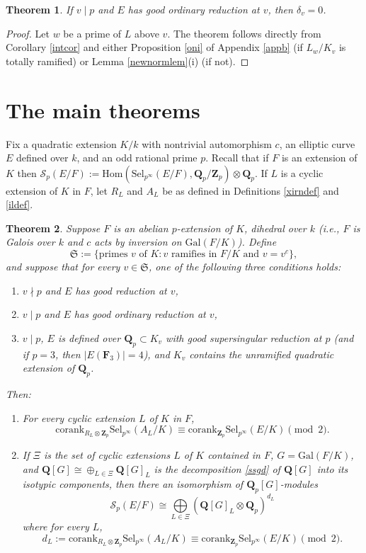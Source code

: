 \documentclass[reqno]{amsart}
\newtheorem{thm}{Theorem}[section]
\theoremstyle{definition}
\renewcommand{\theenumi}{(\roman{enumi})}
\def\Z{\mathbf{Z}}
\def\Q{\mathbf{Q}}
\def\F{\mathbf{F}}
\def\Zp{\Z_p}
\def\Qp{\Q_p}
\def\cS{\mathcal{S}}
\def\Hom{\mathrm{Hom}}
\def\Gal{\mathrm{Gal}}
\def\cork{\mathrm{corank}}
\def\Sel{\mathrm{Sel}}
\def\Scp{\cS_p}
\def\dirsum#1{\underset{#1}{\textstyle\bigoplus}}
\def\k{k}
\def\Sbad{\mathfrak{S}}
\begin{document}
\begin{thm}
\label{par4}
If $v \mid p$ and $E$ has good ordinary reduction at $v$, 
then $\delta_v = 0$.
\end{thm}

\begin{proof}
Let $w$ be a prime of $L$ above $v$.  The theorem follows 
directly from Corollary \ref{intcor} and either 
Proposition \ref{oni} of Appendix \ref{appb} 
(if $L_w/K_v$ is totally ramified) or 
Lemma \ref{newnormlem}(i) (if not).
\end{proof}


\section{The main theorems}
\label{d1}

Fix a quadratic extension $K/\k$ with 
nontrivial automorphism $c$, an elliptic curve $E$ defined 
over $\k$, and an odd rational prime $p$.
Recall that if $F$ is an extension of $K$ then 
$\Scp(E/F) := \Hom(\Sel_{p^\infty}(E/F), \Qp/\Zp) \otimes \Qp$.
If $L$ is a cyclic extension of $K$ in $F$, let $R_L$ and $A_L$ 
be as defined in Definitions \ref{xirndef} and \ref{ildef}.

\begin{thm}
\label{second}
Suppose $F$ is an abelian $p$-extension of $K$, dihedral over $\k$ 
(i.e., $F$ is Galois over $\k$ and $c$ acts by inversion on $\Gal(F/K)$).  
Define
$$
\Sbad := \{\text{primes $v$ of $K$} : \text{$v$ ramifies in $F/K$ and $v = v^c$}\},
$$
and suppose that for every $v \in \Sbad$, one of the following three conditions holds:
\begin{enumerate}
\renewcommand{\theenumi}{(\alph{enumi})}
\item
$v \nmid p$ and $E$ has good reduction at $v$,
\item
$v \mid p$ and $E$ has good ordinary reduction at $v$,
\item
$v \mid p$, $E$ is defined over $\Qp \subset K_v$ 
with good supersingular reduction at $p$ 
(and if $p = 3$, then $|E(\F_3)| = 4$), and $K_v$ contains the unramified 
quadratic extension of $\Qp$.
\end{enumerate}
Then: 
\begin{enumerate}
\item
For every cyclic extension $L$ of $K$ in $F$, 
$$ 
\cork_{R_L \otimes \Zp}\Sel_{p^\infty}(A_L/K) 
    \equiv \cork_{\Zp}\Sel_{p^\infty}(E/K)  \pmod{2}.
$$
\item
If $\Xi$ is the set of cyclic extensions $L$ of $K$ contained in $F$, 
$G = \Gal(F/K)$, 
and $\Q[G] \cong \oplus_{L \in \Xi} \Q[G]_L$ is the decomposition \eqref{ssgd} 
of 
$\Q[G]$ into its isotypic components, then there an isomorphism of 
$\Qp[G]$-modules
$$
\Scp(E/F) \cong \dirsum{L \in \Xi} (\Q[G]_L \otimes \Qp)^{d_L}
$$
where for every $L$,
$$
d_L := \cork_{R_L \otimes \Zp}\Sel_{p^\infty}(A_L/K) 
    \equiv \cork_{\Zp}\Sel_{p^\infty}(E/K) \pmod{2}.
$$ 
\end{enumerate}
\end{thm}
\end{document}
